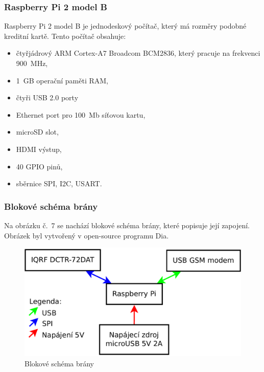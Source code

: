 \documentclass[12pt,a4paper,oneside]{article}
\begin{document}
\subsubsection{Raspberry Pi 2 model B}

Raspberry Pi 2 model B je jednodeskový počítač, který má rozměry podobné kreditní kartě. Tento počítač obsahuje: 

\begin{itemize}
	\renewcommand{\baselinestretch}{1.5}
	\item čtyřjádrový ARM Cortex-A7 Broadcom BCM2836, který pracuje na frekvenci 900~MHz,
	\item 1~GB operační paměti RAM,
	\item čtyři USB 2.0 porty
	\item Ethernet port pro 100~Mb síťovou kartu,
	\item microSD slot,
	\item HDMI výstup,
	\item 40 GPIO pinů,
	\item sběrnice SPI, I2C, USART.
\end{itemize}

\newpage

\subsubsection{Blokové schéma brány}

Na obrázku č.~7 se nachází blokové schéma brány, které popisuje její zapojení. Obrázek byl vytvořený v open-source programu Dia\cite{sw/dia}.

\begin{figure}[H]
\centering
\label{fig:blokove-schema-zasuvky}
\includegraphics[width = 128mm]{img/blokove-schema-brany.pdf}
\caption{Blokové schéma brány}
\end{figure}
\end{document}
